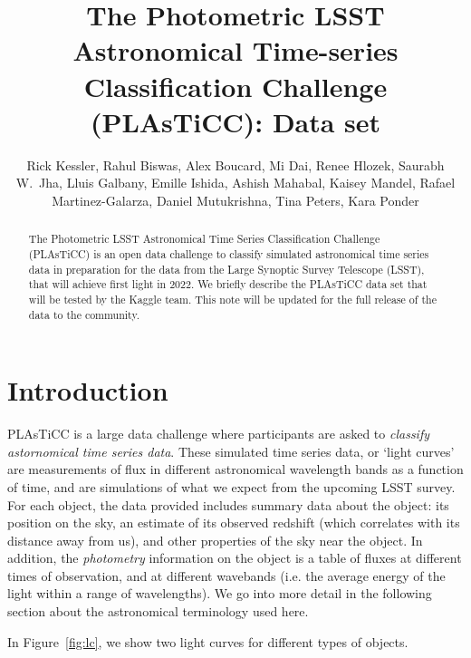 \documentclass[\docopts]{\docclass}
\author{Rick Kessler,  Rahul Biswas, Alex Boucard, Mi Dai, Renee Hlozek,
Saurabh W.~Jha, Lluis Galbany, Emille Ishida, Ashish Mahabal, Kaisey Mandel, Rafael Martinez-Galarza, Daniel Mutukrishna, Tina Peters, Kara Ponder}
\begin{document}
\title{The Photometric LSST Astronomical Time-series Classification Challenge (PLAsTiCC): Data set}


\begin{abstract}
The Photometric LSST Astronomical Time Series Classification Challenge (PLAsTiCC) is an open data challenge to classify simulated astronomical time series data in preparation for the data from the Large Synoptic Survey Telescope (LSST), that will achieve first light in 2022. We briefly describe the PLAsTiCC data set that will be tested by the Kaggle team. This note will be updated for the full release of the data to the community.

\end{abstract}

\dockeys{}

\maketitlepost


\section{Introduction}
\label{sec:intro}
PLAsTiCC is a large data challenge where participants are asked to \textit{classify astornomical time series data}. These simulated time series data, or `light curves' are measurements of flux in different astronomical wavelength bands as a function of time, and are simulations of what we expect from the upcoming LSST survey. For each object, the data provided includes summary data about the object: its position on the sky, an estimate of its observed redshift (which correlates with its distance away from us), and other properties of the sky near the object. In addition, the \textit{photometry} information on the object is a table of fluxes at different times of observation, and at different wavebands (i.e. the average energy of the light within a range of wavelengths). We go into more detail in the following section about the astronomical terminology used here.

In Figure~\ref{fig:lc}, we show two light curves for different types of objects.
\end{document}
